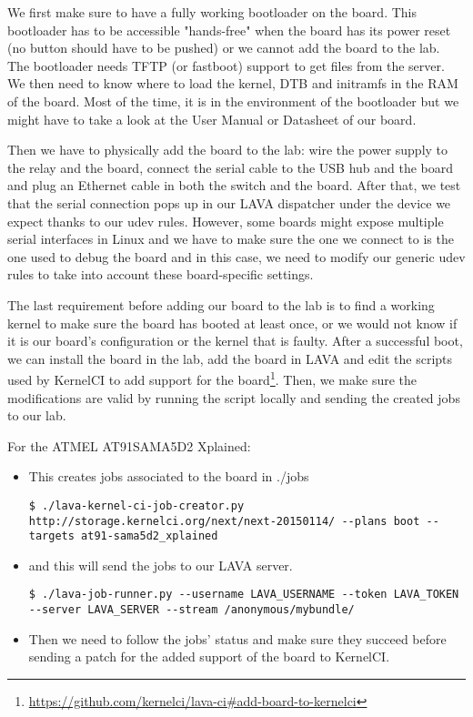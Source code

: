 We first make sure to have a fully working bootloader on the board. This bootloader has to be accessible "hands-free" when the board has its power reset (no button should have to be pushed) or we cannot add the board to the lab. The bootloader needs TFTP (or fastboot) support to get files from the server. We then need to know where to load the kernel, DTB and initramfs in the RAM of the board. Most of the time, it is in the environment of the bootloader but we might have to take a look at the User Manual or Datasheet of our board.

Then we have to physically add the board to the lab: wire the power supply to the relay and the board, connect the serial cable to the USB hub and the board and plug an Ethernet cable in both the switch and the board. After that, we test that the serial connection pops up in our LAVA dispatcher under the device we expect thanks to our udev rules. However, some boards might expose multiple serial interfaces in Linux and we have to make sure the one we connect to is the one used to debug the board and in this case, we need to modify our generic udev rules to take into account these board-specific settings.

The last requirement before adding our board to the lab is to find a working kernel to make sure the board has booted at least once, or we would not know if it is our board's configuration or the kernel that is faulty. After a successful boot, we can install the board in the lab, add the board in LAVA and edit the scripts used by KernelCI to add support for the board\footnote{\url{https://github.com/kernelci/lava-ci\#add-board-to-kernelci}}. Then, we make sure the modifications are valid by running the script locally and sending the created jobs to our lab.

For the ATMEL AT91SAMA5D2 Xplained:
\begin{itemize}
  \item This creates jobs associated to the board in ./jobs

\begin{verbatim}
$ ./lava-kernel-ci-job-creator.py http://storage.kernelci.org/next/next-20150114/ --plans boot --targets at91-sama5d2_xplained
\end{verbatim}

  \item and this will send the jobs to our LAVA server.

\begin{verbatim}
$ ./lava-job-runner.py --username LAVA_USERNAME --token LAVA_TOKEN --server LAVA_SERVER --stream /anonymous/mybundle/
\end{verbatim}

  \item Then we need to follow the jobs' status and make sure they succeed before sending a patch for the added support of the board to KernelCI.
\end{itemize}

